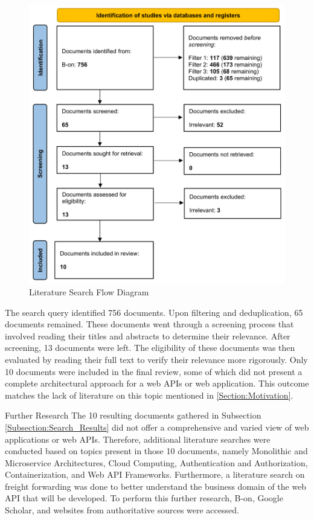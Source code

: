 \documentclass[12pt,reqno, oneside]{amsbook}
\makeatletter
\def\section{\@startsection{section}{1}%
      \z@{.5\linespacing\@plus.7\linespacing}{.25\linespacing}%
      {\normalfont\bfseries\flushleft}}
\theoremstyle{definition}
\theoremstyle{definition}
\numberwithin{section}{chapter}
\numberwithin{table}{chapter}
\numberwithin{figure}{chapter}
\makeatother
\begin{document}
\begin{figure}[H]
  \centering
  \includegraphics[width=0.9\linewidth]{images/Literature_Search_Flow_Diagram.png}
  \caption{\label{Figure:Literature_Search_Flow_Diagram}Literature Search Flow Diagram}
\end{figure}

The search query identified 756 documents. Upon filtering and deduplication, 65 documents remained. These documents went through a screening process that involved reading their titles and abstracts to determine their relevance. After screening, 13 documents were left. The eligibility of these documents was then evaluated by reading their full text to verify their relevance more rigorously. Only 10 documents were included in the final review, some of which did not present a complete architectural approach for a web \acp{API} or web application. This outcome matches the lack of literature on this topic mentioned in \ref{Section:Motivation}.

\section{Further Research}
\label{Further_Research}
The 10 resulting documents gathered in Subsection \ref{Subsection:Search_Results} did not offer a comprehensive and varied view of web applications or web \acp{API}. Therefore, additional literature searches were conducted based on topics present in those 10 documents, namely Monolithic and Microservice Architectures, Cloud Computing, Authentication and Authorization, Containerization, and Web \ac{API} Frameworks.
Furthermore, a literature search on freight forwarding was done to better understand the business domain of the web API that will be developed. To perform this further research, B-on, Google Scholar, and websites from authoritative sources were accessed.
\end{document}
